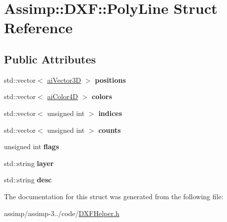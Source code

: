 \hypertarget{struct_assimp_1_1_d_x_f_1_1_poly_line}{\section{Assimp\+:\+:D\+X\+F\+:\+:Poly\+Line Struct Reference}
\label{struct_assimp_1_1_d_x_f_1_1_poly_line}
}
\subsection*{Public Attributes}
\begin{DoxyCompactItemize}
\item 
\hypertarget{struct_assimp_1_1_d_x_f_1_1_poly_line_ace66ff155e0f1e5be90a971847d82418}{std\+::vector$<$ \hyperlink{structai_vector3_d}{ai\+Vector3\+D} $>$ {\bfseries positions}}\label{struct_assimp_1_1_d_x_f_1_1_poly_line_ace66ff155e0f1e5be90a971847d82418}

\item 
\hypertarget{struct_assimp_1_1_d_x_f_1_1_poly_line_a90bab0cecc50735ccf3ed3f6dfdc80c0}{std\+::vector$<$ \hyperlink{structai_color4_d}{ai\+Color4\+D} $>$ {\bfseries colors}}\label{struct_assimp_1_1_d_x_f_1_1_poly_line_a90bab0cecc50735ccf3ed3f6dfdc80c0}

\item 
\hypertarget{struct_assimp_1_1_d_x_f_1_1_poly_line_a8241140397f444efe00c95239511455b}{std\+::vector$<$ unsigned int $>$ {\bfseries indices}}\label{struct_assimp_1_1_d_x_f_1_1_poly_line_a8241140397f444efe00c95239511455b}

\item 
\hypertarget{struct_assimp_1_1_d_x_f_1_1_poly_line_a9b8736021609c0809a4164313f48eba1}{std\+::vector$<$ unsigned int $>$ {\bfseries counts}}\label{struct_assimp_1_1_d_x_f_1_1_poly_line_a9b8736021609c0809a4164313f48eba1}

\item 
\hypertarget{struct_assimp_1_1_d_x_f_1_1_poly_line_a942f9e3545a1f7c71be01ff665ec493b}{unsigned int {\bfseries flags}}\label{struct_assimp_1_1_d_x_f_1_1_poly_line_a942f9e3545a1f7c71be01ff665ec493b}

\item 
\hypertarget{struct_assimp_1_1_d_x_f_1_1_poly_line_a9bb2021a50f361688c8fb4ce46f1009d}{std\+::string {\bfseries layer}}\label{struct_assimp_1_1_d_x_f_1_1_poly_line_a9bb2021a50f361688c8fb4ce46f1009d}

\item 
\hypertarget{struct_assimp_1_1_d_x_f_1_1_poly_line_a3dcbfe5e22850d4f457c384c24101b79}{std\+::string {\bfseries desc}}\label{struct_assimp_1_1_d_x_f_1_1_poly_line_a3dcbfe5e22850d4f457c384c24101b79}

\end{DoxyCompactItemize}


The documentation for this struct was generated from the following file\+:\begin{DoxyCompactItemize}
\item 
assimp/assimp-\/3../code/\hyperlink{_d_x_f_helper_8h}{D\+X\+F\+Helper.\+h}\end{DoxyCompactItemize}
